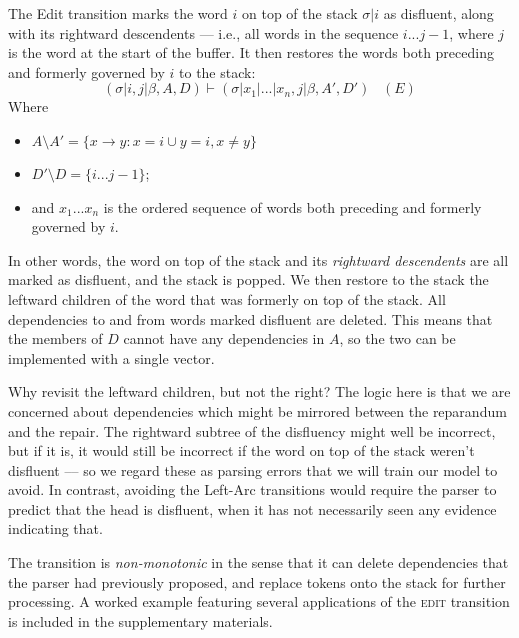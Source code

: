 \documentclass[11pt,letterpaper]{article}
\begin{document}
The Edit transition marks the word $i$ on top of the stack $\sigma | i$ as
disfluent, along with its rightward descendents --- i.e., all words in the
sequence $i...j-1$, where $j$ is the word at the start of the buffer. It then
restores the words both preceding and formerly governed by $i$ to the stack:
\begin{equation}
    (\sigma | i, j | \beta, A, D) \vdash (\sigma | x_1 | ... | x_n, j | \beta,A',D')\;\;\;(E)
    \nonumber
\end{equation}
Where 
\begin{itemize}
    \itemsep0em
    \item $A \setminus A' = \{x \rightarrow y : x = i \cup y = i, x \ne y \}$
    \item $D' \setminus D = \{i...j-1\}$;
\item  and $x_1...x_n$ is the ordered sequence of words both preceding and formerly governed
by $i$.
\end{itemize}
In other words, the word on top of the stack and its \emph{rightward descendents}
are all marked as disfluent, and the stack is popped. We then restore to the stack
the leftward children of the word that was formerly on top of the
stack. All dependencies to and from words marked disfluent are deleted. 
This means that the members of $D$ cannot have any dependencies in $A$, so the
two can be implemented with a single vector.

Why revisit the leftward children, but not the right? The logic here is that we
are concerned about dependencies which might be mirrored between the reparandum
and the repair. The rightward subtree of the disfluency might well be incorrect,
but if it is, it would still be incorrect if the word on top of the stack weren't
disfluent --– so we regard these as parsing errors that we will train our model
to avoid. In contrast, avoiding the Left-Arc transitions would require the parser to
predict that the head is disfluent, when it has not necessarily seen any evidence
indicating that.

The transition is \emph{non-monotonic} in the sense that it can delete dependencies
that the parser had previously proposed, and replace tokens onto the stack for
further processing. 
A worked example featuring several applications of the \textsc{edit} transition
is included in the supplementary materials.
\end{document}
